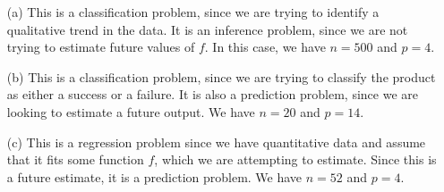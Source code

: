 
\begin{itemize}
    \item[(a)] This is a classification problem, since we are trying to identify
    a qualitative trend in the data. It is an inference problem, since we are not
    trying to estimate future values of $f$. In this case, we have $n = 500$ and
    $p = 4$.
    \item[(b)] This is a classification problem, since we are trying to classify 
    the product as either a success or a failure. It is also a prediction problem,
    since we are looking to estimate a future output. We have $n = 20$ and $p = 14$.
    \item[(c)] This is a regression problem since we have quantitative data and
    assume that it fits some function $f$, which we are attempting to estimate. 
    Since this is a future estimate, it is a prediction problem. We have $n = 52$ 
    and $p = 4$.
\end{itemize}
